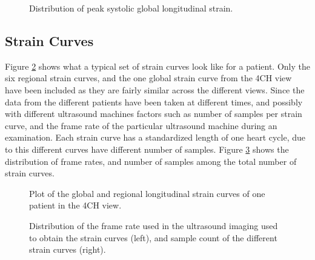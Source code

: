 \begin{figure}
    \centering
    
    \caption{Distribution of peak systolic global longitudinal strain.}
    \label{fig:gls_dist}
\end{figure}

\clearpage

\subsection{Strain Curves}
Figure \ref{fig:strain_curves} shows what a typical set of strain curves look like for a patient. Only the six regional strain curves, and the one global strain curve from the 4CH view have been included as they are fairly similar across the different views. Since the data from the different patients have been taken at different times, and possibly with different ultrasound machines factors such as number of samples per strain curve, and the frame rate of the particular ultrasound machine during an examination. Each strain curve has a standardized length of one heart cycle, due to this different curves have different number of samples. Figure \ref{fig:fr_sample_dist} shows the distribution of frame rates, and number of samples among the total number of strain curves. \bigskip

\begin{figure}[h]
    \centering
    
    \caption{Plot of the global and regional longitudinal strain curves of one patient in the 4CH view.}
    \label{fig:strain_curves}
\end{figure}

\begin{figure}
    \centering
    
    \caption{Distribution of the frame rate used in the ultrasound imaging used to obtain the strain curves (left), and sample count of the different strain curves (right).}
    \label{fig:fr_sample_dist}
\end{figure}

\newpage

